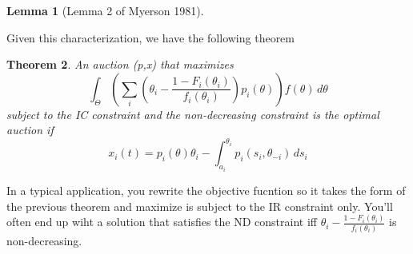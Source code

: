 \documentclass[letter, 10pt]{article}
\newtheorem{theorem}{Theorem}[section]
\newtheorem{lemma}[theorem]{Lemma}
\theoremstyle{definition}
\begin{document}
\begin{spacing}{1.1}
\begin{lemma}[Lemma 2 of Myerson 1981]
\end{lemma}

Given this characterization, we have the following
theorem
\begin{theorem}
  An auction (p,x) that maximizes
  \begin{equation}
    \label{eq:4}
    \int_\Theta \left( \sum_i\left(\theta_i -
        \frac{1-F_i(\theta_i)}{f_i(\theta_i)}\right)p_i(\theta)\right) f(\theta)\,d\theta
  \end{equation}
  subject to the IC constraint and the non-decreasing
  constraint is the optimal auction if
  \begin{equation}
 x_i(t) = p_i(\theta)\theta_i - \int_{a_i}^{\theta_i} p_i(s_i,\theta_{-i})\,ds_i\label{eq:6}
 \end{equation}
\end{theorem}
In a typical application, you rewrite the objective
fucntion so it takes the form of the previous theorem and
maximize is subject to the IR constraint only. You'll
often end up wiht a solution that satisfies the ND
constraint iff $\theta_i -
\frac{1-F_i(\theta_i)}{f_i(\theta_i)}$ is non-decreasing.

\end{spacing}
\end{document}
